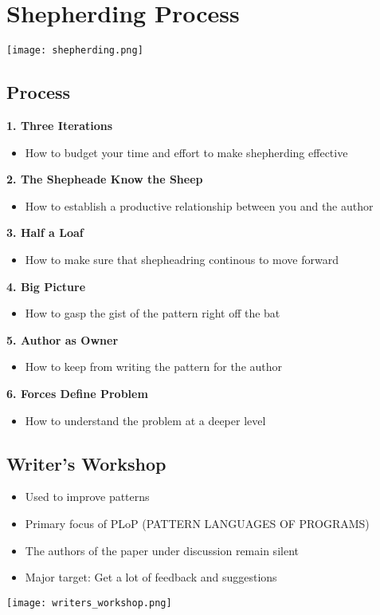 \section{Shepherding Process}
\texttt{[image: shepherding.png]}
\subsection{Process}
\textbf{1. Three Iterations}
\begin{itemize}
    \item How to budget your time and effort to make shepherding effective
\end{itemize}
\textbf{2. The Shepheade Know the Sheep}
\begin{itemize}
    \item How to establish a productive relationship between you and the author
\end{itemize}
\textbf{3. Half a Loaf}
\begin{itemize}
    \item How to make sure that shepheadring continous to move forward
\end{itemize}
\textbf{4. Big Picture}
\begin{itemize}
    \item How to gasp the gist of the pattern right off the bat
\end{itemize}
\textbf{5. Author as Owner}
\begin{itemize}
    \item How to keep from writing the pattern for the author
\end{itemize}
\textbf{6. Forces Define Problem}
\begin{itemize}
    \item How to understand the problem at a deeper level
\end{itemize}

\subsection{Writer's Workshop}
\begin{itemize}
    \item Used to improve patterns
    \item Primary focus of PLoP (PATTERN LANGUAGES OF PROGRAMS)
    \item The authors of the paper under discussion remain silent
    \item Major target: Get a lot of feedback and suggestions
\end{itemize}
\texttt{[image: writers\_workshop.png]}

